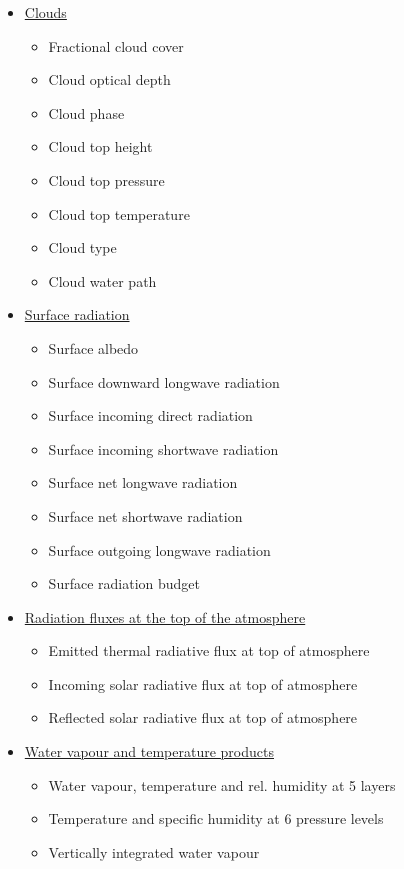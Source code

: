 \documentclass[11pt]{article}
\begin{document}
\begin{itemize}
\item \href{http://wui.cmsaf.eu/safira/action/viewProduktList?id=1}{Clouds}
\begin{itemize}
\item Fractional cloud cover
\item Cloud optical depth
\item Cloud phase
\item Cloud top height
\item Cloud top pressure
\item Cloud top temperature
\item Cloud type
\item Cloud water path
\end{itemize}
\item \href{http://wui.cmsaf.eu/safira/action/viewProduktList?id=2}{Surface radiation}
\begin{itemize}
\item Surface albedo
\item Surface downward longwave radiation
\item Surface incoming direct radiation
\item Surface incoming shortwave radiation
\item Surface net longwave radiation
\item Surface net shortwave radiation
\item Surface outgoing longwave radiation
\item Surface radiation budget
\end{itemize}
\item \href{http://wui.cmsaf.eu/safira/action/viewProduktList?id=3}{Radiation fluxes at the top of the atmosphere}
\begin{itemize}
\item Emitted thermal radiative flux at top of atmosphere
\item Incoming solar radiative flux at top of atmosphere
\item Reflected solar radiative flux at top of atmosphere
\end{itemize}
\item \href{http://wui.cmsaf.eu/safira/action/viewProduktList?id=5}{Water vapour and temperature products}
\begin{itemize}
\item Water vapour, temperature and rel. humidity at 5 layers
\item Temperature and specific humidity at 6 pressure levels
\item Vertically integrated water vapour
\end{itemize}
\end{itemize}
\end{document}

